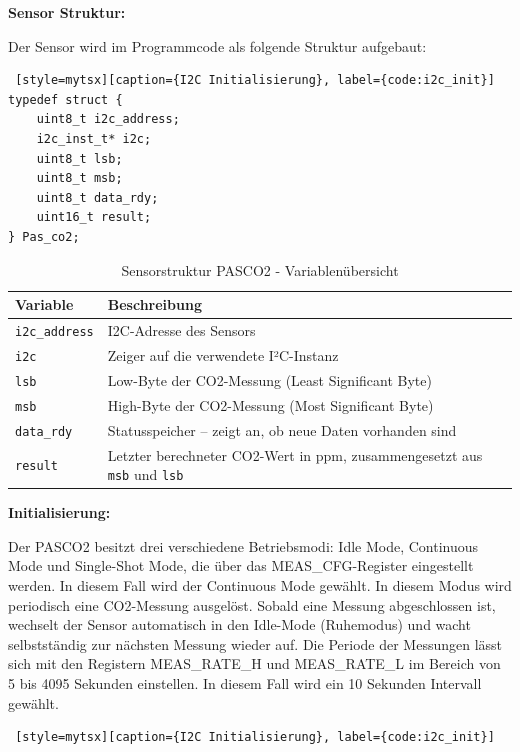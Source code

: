 \begin{inhalt}
\textbf{Sensor Struktur:}

Der Sensor wird im Programmcode als folgende Struktur aufgebaut:

\begin{lstlisting} [style=mytsx][caption={I2C Initialisierung}, label={code:i2c_init}]
typedef struct {
    uint8_t i2c_address;
    i2c_inst_t* i2c;
    uint8_t lsb;
    uint8_t msb;
    uint8_t data_rdy;
    uint16_t result;
} Pas_co2;
\end{lstlisting}

\begin{table}[H]
\centering
\renewcommand{\arraystretch}{1.3}
\begin{tabular}{|l|p{11cm}|}
\hline
\rowcolor{cyan!20}
\textbf{Variable} & \textbf{Beschreibung} \\
\hline
\texttt{i2c\_address} & I2C-Adresse des Sensors\\
\hline
\texttt{i2c} & Zeiger auf die verwendete I²C-Instanz \\
\hline
\texttt{lsb} & Low-Byte der CO2-Messung (Least Significant Byte) \\
\hline
\texttt{msb} & High-Byte der CO2-Messung (Most Significant Byte) \\
\hline
\texttt{data\_rdy} & Statusspeicher – zeigt an, ob neue Daten vorhanden sind \\
\hline
\texttt{result} & Letzter berechneter CO2-Wert in ppm, zusammengesetzt aus \texttt{msb} und \texttt{lsb} \\
\hline
\end{tabular}
\caption{Sensorstruktur PASCO2 - Variablenübersicht}
\label{tab:co2_struct_vars}
\end{table}

\textbf{Initialisierung:}

Der PASCO2 besitzt drei verschiedene Betriebsmodi: Idle Mode, Continuous Mode und Single-Shot Mode, die über das MEAS\_CFG-Register eingestellt werden. In diesem Fall wird der Continuous Mode gewählt. In diesem Modus wird periodisch eine CO2-Messung ausgelöst. Sobald eine Messung abgeschlossen ist, wechselt der Sensor automatisch in den Idle-Mode (Ruhemodus) und wacht selbstständig zur nächsten Messung wieder auf. Die Periode der Messungen lässt sich mit den Registern MEAS\_RATE\_H und MEAS\_RATE\_L im Bereich von 5 bis 4095 Sekunden einstellen. In diesem Fall wird ein 10 Sekunden Intervall gewählt.

\begin{lstlisting} [style=mytsx][caption={I2C Initialisierung}, label={code:i2c_init}]


\end{lstlisting}
\end{inhalt}
